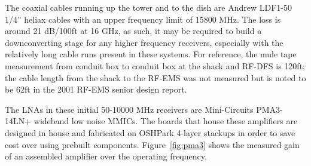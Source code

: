 \documentclass[titlepage]{article}
\begin{document}
The coaxial cables running up the tower and to the dish are Andrew LDF1-50 1/4'' heliax cables with an upper frequency limit of 15800 MHz. The loss is around 21 dB/100ft at 16 GHz, as such, it may be required to build a downconverting stage for any higher frequency receivers, especially with the relatively long cable runs present in these systems. For reference, the mule tape measurement from conduit box to conduit box at the shack and RF-DFS is 120ft; the cable length from the shack to the RF-EMS was not measured but is noted to be 62ft in the 2001 RF-EMS senior design report.

The LNAs in these initial 50-10000 MHz receivers are Mini-Circuits PMA3-14LN+ wideband low noise MMICs. The boards that house these amplifiers are designed in house and fabricated on OSHPark 4-layer stackups in order to save cost over using prebuilt components. Figure~\ref{fig:pma3} shows the measured gain of an assembled amplifier over the operating frequency.
\end{document}
